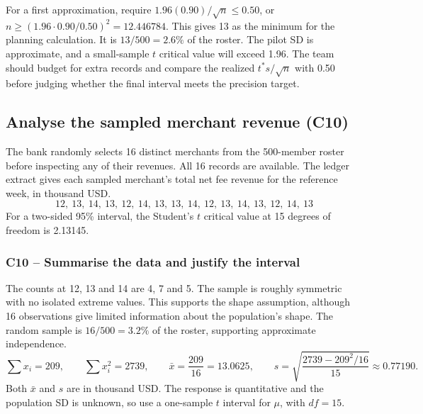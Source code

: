 	For a first approximation, require $1.96(0.90)/\sqrt n\le 0.50$, or $n\ge (1.96\cdot0.90/0.50)^2=12.446784$. This gives 13 as the minimum for the planning calculation. It is $13/500=2.6\%$ of the roster. The pilot SD is approximate, and a small-sample $t$ critical value will exceed 1.96. The team should budget for extra records and compare the realized $t^*s/\sqrt n$ with 0.50 before judging whether the final interval meets the precision target.


	\clearpage

	\subsection{Analyse the sampled merchant revenue (C10)}
	\label{prob:c10-2}

	The bank randomly selects 16 distinct merchants from the 500-member roster before inspecting any of their revenues. All 16 records are available. The ledger extract gives each sampled merchant's total net fee revenue for the reference week, in thousand USD.
	\[
	12,\ 13,\ 14,\ 13,\ 12,\ 14,\ 13,\ 13,\ 14,\ 12,\ 13,\ 14,\ 13,\ 12,\ 14,\ 13
	\]
	For a two-sided 95\% interval, the Student's $t$ critical value at 15 degrees of freedom is 2.13145.


	\label{sol:c10-2-a}
	\subsubsection*{C10 -- Summarise the data and justify the interval}

	The counts at 12, 13 and 14 are 4, 7 and 5. The sample is roughly symmetric with no isolated extreme values. This supports the shape assumption, although 16 observations give limited information about the population's shape. The random sample is $16/500=3.2\%$ of the roster, supporting approximate independence.
	\[
	\sum x_i=209,\qquad \sum x_i^2=2739,\qquad
	\bar x=\frac{209}{16}=13.0625,\qquad
	s=\sqrt{\frac{2739-209^2/16}{15}}\approx0.77190.
	\]
	Both $\bar x$ and $s$ are in thousand USD. The response is quantitative and the population SD is unknown, so use a one-sample $t$ interval for $\mu$, with $df=15$.

